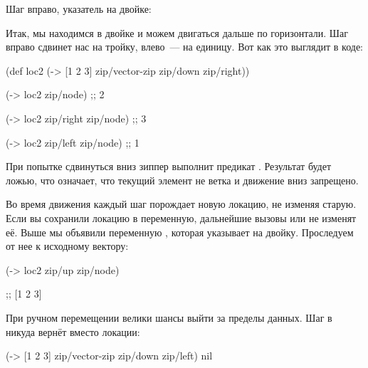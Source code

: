 \begin{figure}[H]
  \centering
  
  \label{fig:chart-zip-02}
\end{figure}

\pagebreaklarge

Шаг вправо, указатель на двойке:

\begin{figure}[H]
  \centering
  
  \label{fig:chart-zip-03}
\end{figure}

Итак, мы находимся в двойке и можем двигаться дальше по горизонтали. Шаг вправо
сдвинет нас на тройку, влево~--- на единицу. Вот как это выглядит в коде:

\begin{english}
  \begin{clojure}
(def loc2
  (-> [1 2 3]
      zip/vector-zip
      zip/down
      zip/right))

(-> loc2 zip/node)           ;; 2

(-> loc2 zip/right zip/node) ;; 3

(-> loc2 zip/left zip/node)  ;; 1
  \end{clojure}
\end{english}

При попытке сдвинуться вниз зиппер выполнит предикат . Результат
будет ложью, что означает, что текущий элемент не ветка и движение вниз
запрещено.

Во время движения каждый шаг порождает новую локацию, не изменяя старую. Если вы
сохранили локацию в переменную, дальнейшие вызовы  или
 не изменят её. Выше мы объявили переменную , которая
указывает на двойку. Проследуем от нее к исходному вектору:

\begin{english}
  \begin{clojure}
(-> loc2 zip/up zip/node)

;; [1 2 3]
  \end{clojure}
\end{english}

\pagebreaklarge

При ручном перемещении велики шансы выйти за пределы данных. Шаг в никуда вернёт
 вместо локации:

\begin{english}
  \begin{clojure}
(-> [1 2 3]
    zip/vector-zip
    zip/down
    zip/left)
nil
  \end{clojure}
\end{english}

